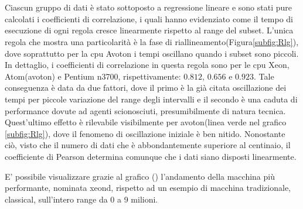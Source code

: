 \begin{figure}[H]
\centering
{} \quad
{} \\
\end{figure}
\begin{figure}[H]
\ContinuedFloat
\centering
{} \quad
{} \\
\end{figure}
\begin{figure}[H]
\ContinuedFloat
\centering
{} 
\caption{}
\label{fig:Tdip}
\end{figure}

Ciascun gruppo di dati è stato sottoposto a regressione lineare e sono stati pure calcolati i coefficienti di correlazione, i quali hanno evidenziato come il tempo di esecuzione di ogni regola cresce linearmente rispetto al range del subset.
L'unica regola che mostra una particolarità è la fase di riallineamento(Figura\ref{subfig:Rlg}), dove soprattutto per la cpu Avoton i tempi oscillano quando i subset sono piccoli. 
In dettaglio, i coefficienti di correlazione in questa regola sono per le cpu Xeon, Atom(avoton) e Pentium n3700, rispettivamente: $0.812$, $0.656$ e $0.923$. 
Tale conseguenza è data da due fattori, dove il primo è la già citata oscillazione dei tempi per piccole variazione del range degli intervalli e il secondo è una caduta di performance dovute ad agenti scionosciuti, presumibilmente di natura tecnica.
Quest'ultimo effetto è rilevabile visibilmente per avoton(linea verde nel grafico \ref{subfig:Rlg}), dove il fenomeno di oscillazione iniziale è ben nitido.
Nonostante ciò, visto che il numero di dati che è abbondantemente superiore al centinaio, il coefficiente di Pearson determina comunque che i dati siano disposti linearmente.

E' possibile visualizzare grazie al grafico () l'andamento della macchina più performante, nominata xeond, rispetto ad un esempio di macchina tradizionale, classical, sull'intero range da 0 a 9 milioni.


